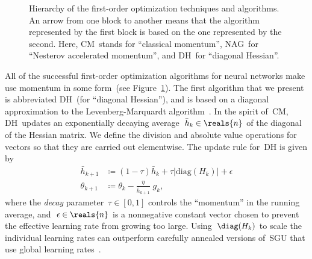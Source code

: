 \documentclass[11pt,a4paper]{article}
\numberwithin{equation}{section}
\begin{document}
\begin{figure}[t]
\centering
{}
\caption{Hierarchy of the first-order optimization techniques and algorithms.
An arrow from one block to another means that the algorithm represented by the
first block is based on the one represented by the second. Here, CM~stands for
``classical momentum'', NAG~for ``Nesterov accelerated momentum'', and DH~for
``diagonal Hessian''.\label{fig:first_order_hierarchy}}
\end{figure}

All of the successful first-order optimization algorithms for neural networks
make use momentum in some form~(see Figure~\ref{fig:first_order_hierarchy}). The
first algorithm that we present is abbreviated DH~(for ``diagonal Hessian''),
and is based on a diagonal approximation to the Levenberg-Marquardt
algorithm~\citep{lecun-98b}. In the spirit of~CM, DH~updates an exponentially
decaying average~$\bar{h}_k \in \reals{n}$ of the diagonal of the Hessian
matrix. We define the division and absolute value operations for vectors so that
they are carried out elementwise. The update rule for~DH is given by
\begin{align*}
	\bar{h}_{k + 1} &\coloneqq (1 - \tau) \bar{h}_k + \tau |\text{diag}(H_k)| + \epsilon \\
	\theta_{k + 1}  &\coloneqq \theta_k - \frac{\eta}{\bar{h}_{k + 1}} \;g_k,
\end{align*}
where the \emph{decay} parameter~$\tau \in [0, 1]$ controls the ``momentum'' in
the running average, and~$\epsilon \in \reals{n}$ is a nonnegative constant
vector chosen to prevent the effective learning rate from growing too large.
Using~$\diag(H_k)$ to scale the individual learning rates can outperform
carefully annealed versions of~SGU that use global learning
rates~\citep{lecun-98b}.
\end{document}
